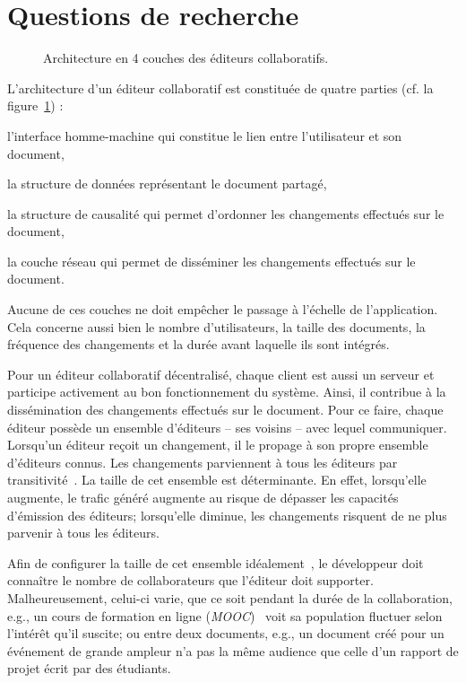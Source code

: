 
\section{Questions de recherche}

\begin{figure}
  \begin{center}
    
    \caption[Architecture des éditeurs collaboratifs]
    {\label{intro:fig:architecture} Architecture en 4 couches des éditeurs
      collaboratifs.}
  \end{center}
\end{figure}

L'architecture d'un éditeur collaboratif est constituée de quatre parties
(cf. la figure~\ref{intro:fig:architecture}) :
\begin{inparaenum}[(i)]
\item l'interface homme-machine qui constitue le lien entre l'utilisateur et son
  document, 
\item la structure de données représentant le document partagé,
\item la structure de causalité qui permet d'ordonner les changements effectués
  sur le document,
\item la couche réseau qui permet de disséminer les changements effectués sur le
  document.
\end{inparaenum}

Aucune de ces couches ne doit empêcher le passage à l'échelle de l'application.
Cela concerne aussi bien le nombre d'utilisateurs, la taille des documents, la
fréquence des changements et la durée avant laquelle ils sont intégrés.

Pour un éditeur collaboratif décentralisé, chaque client est aussi un serveur et
participe activement au bon fonctionnement du système. Ainsi, il contribue à la
dissémination des changements effectués sur le document. Pour ce faire, chaque
éditeur possède un ensemble d'éditeurs -- ses voisins -- avec lequel
communiquer. Lorsqu'un éditeur reçoit un changement, il le propage à son propre
ensemble d'éditeurs connus. Les changements parviennent à tous les éditeurs par
transitivité~\cite{birman1999bimodal}.  La taille de cet ensemble est
déterminante. En effet, lorsqu'elle augmente, le trafic généré augmente au
risque de dépasser les capacités d'émission des éditeurs; lorsqu'elle diminue,
les changements risquent de ne plus parvenir à tous les éditeurs.

Afin de configurer la taille de cet ensemble idéalement~\cite{erdos1959random},
le développeur doit connaître le nombre de collaborateurs que l'éditeur doit
supporter. Malheureusement, celui-ci varie, que ce soit pendant la durée de la
collaboration, e.g., un cours de formation en ligne
(\emph{MOOC})~\cite{breslow2013studying} voit sa population fluctuer selon
l'intérêt qu'il suscite; ou entre deux documents, e.g., un document créé pour un
événement de grande ampleur n'a pas la même audience que celle d'un rapport de
projet écrit par des étudiants.

